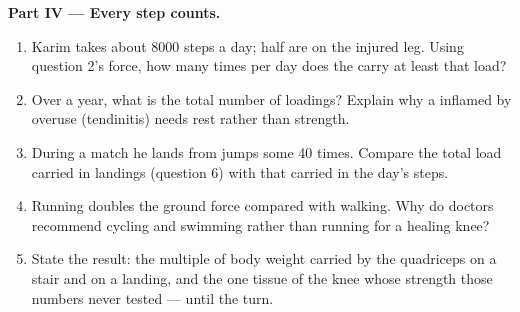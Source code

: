 \begin{problem}
\medskip
\noindent\textbf{Part IV --- Every step counts.}
\begin{enumerate}[resume]
  \item Karim takes about 8000 steps a day; half are on the injured
        leg. Using question 2's force, how many times per day does the
         carry at least that load?
  \item Over a year, what is the total number of loadings? Explain why
        a  inflamed by overuse (tendinitis) needs rest rather
        than strength.
  \item During a match he lands from jumps some 40 times. Compare the
        total load carried in landings (question 6) with that carried
        in the day's steps.
  \item Running doubles the ground force compared with walking. Why do
        doctors recommend cycling and swimming rather than running for
        a healing knee?
  \item State the result: the multiple of body weight carried by the
        quadriceps  on a stair and on a landing, and the one
        tissue of the knee whose strength those numbers never tested
        --- until the turn.
\end{enumerate}
\end{problem}
